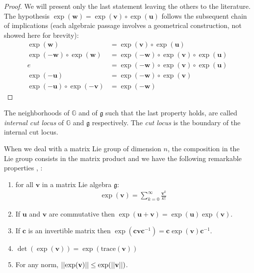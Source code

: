 \begin{proof}
	We will present only the last statement leaving the others to the literature. The hypothesis $\exp(\mathbf{w}) = \exp(\mathbf{v}) \circ \exp(\mathbf{u})$ follows the subsequent chain of implications (each algebraic passage involves a geometrical construction, not showed here for brevity):
	\begin{align*}
		\exp(\mathbf{w}) &= \exp(\mathbf{v}) \circ \exp(\mathbf{u}) \\
		\exp(-\mathbf{w}) \circ \exp(\mathbf{w}) &= \exp(-\mathbf{w}) \circ\exp(\mathbf{v}) \circ \exp(\mathbf{u}) \\
		e &= \exp(-\mathbf{w}) \circ\exp(\mathbf{v}) \circ \exp(\mathbf{u}) \\
		\exp(-\mathbf{u})  &= \exp(-\mathbf{w}) \circ\exp(\mathbf{v})  \\
		\exp(-\mathbf{u}) \circ\exp(-\mathbf{v})  &= \exp(-\mathbf{w})  
	\end{align*}
\end{proof}
The neighborhoods of $\mathbb{G}$ and of $\mathfrak{g}$ such that the last property holds, are called \emph{internal cut locus} of $\mathbb{G}$ and $\mathfrak{g}$ respectively. The \emph{cut locus} is the boundary of the internal cut locus.

When we deal with a matrix Lie group of dimension $n$, the composition in the Lie group consists in the matrix product and we have the following remarkable properties \cite{hall2015lie}, \cite{kirillov2008introduction}:
\begin{enumerate}
	\item for all $\mathbf{v}$ in a matrix Lie algebra $\mathfrak{g}$:
	\begin{align}\label{eq:exp_as_inf_sum}
	\exp(\mathbf{v}) = \sum_{k=0}^{\infty} \frac{\mathbf{v}^{k}}{k!}
	\end{align}
	\item If $\mathbf{u}$ and $\mathbf{v}$ are commutative then $\exp(\mathbf{u} + \mathbf{v}) = \exp(\mathbf{u})\exp(\mathbf{v})$.
	\item If $\mathbf{c}$ is an invertible matrix then $\exp(\mathbf{c}\mathbf{v}\mathbf{c}^{-1}) = \mathbf{c}\exp(\mathbf{v})\mathbf{c}^{-1}$.
	\item $\det(\exp(\mathbf{v})) = \exp(\text{trace}(\mathbf{v}))$
	\item For any norm, $\vert\lvert \exp(\mathbf{v}) \rvert\vert \leq \exp(\vert\lvert \mathbf{v} \rvert\vert)$.
\end{enumerate}

